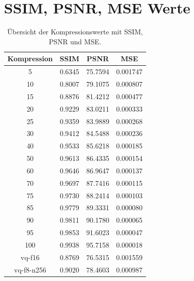 \section*{SSIM, PSNR, MSE Werte}
        \begin{table}[h!]
\centering
\begin{tabular}{|c|c|c|c|}
\hline
\textbf{Kompression} & \textbf{SSIM} & \textbf{PSNR} & \textbf{MSE} \\ \hline
5                    & 0.6345        & 75.7594       & 0.001747     \\ \hline
10                   & 0.8007        & 79.1075       & 0.000807     \\ \hline
15                   & 0.8876        & 81.4212       & 0.000477     \\ \hline
20                   & 0.9229        & 83.0211       & 0.000333     \\ \hline
25                   & 0.9359        & 83.9889       & 0.000268     \\ \hline
30                   & 0.9412        & 84.5488       & 0.000236     \\ \hline
40                   & 0.9533        & 85.6218       & 0.000185     \\ \hline
50                   & 0.9613        & 86.4335       & 0.000154     \\ \hline
60                   & 0.9646        & 86.9647       & 0.000137     \\ \hline
70                   & 0.9697        & 87.7416       & 0.000115     \\ \hline
75                   & 0.9730        & 88.2414       & 0.000103     \\ \hline
85                   & 0.9779        & 89.3331       & 0.000080     \\ \hline
90                   & 0.9811        & 90.1780       & 0.000065     \\ \hline
95                   & 0.9853        & 91.6023       & 0.000047     \\ \hline
100                  & 0.9938        & 95.7158       & 0.000018     \\ \hline
vq-f16               & 0.8769        & 76.5315       & 0.001559     \\ \hline
vq-f8-n256           & 0.9020        & 78.4603       & 0.000987     \\ \hline
\end{tabular}
\caption{Übersicht der Kompressionswerte mit SSIM, PSNR und MSE.}
\label{tab:compression}
\end{table}

